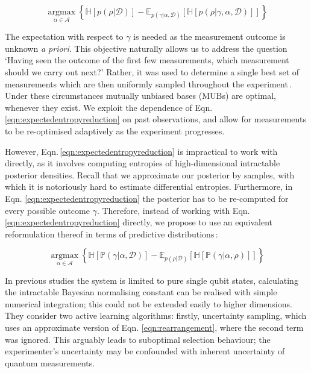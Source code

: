 \documentclass[aps,twocolumn,prl]{revtex4-1}
\newcommand{\param}{{\rho}} \newcommand{\data}{\mathcal{D}}
\newcommand{\argmax}{ \operatorname*{argmax}}
\newcommand{\config}{\alpha} \newcommand{\configset}{\mathcal{A}}
\newcommand{\outcome}{\gamma} \newcommand{\ie}{i.\,e.\ }
\begin{document}
\begin{equation}
\argmax_{\config\in\configset} \left\{ \mathbb{H}\left[p(\param|\data)\right] - \mathbb{E}_{p(\outcome\vert\config,\data)}\left[\mathbb{H}\left[ p(\param|\outcome,\config,\data) \right] \right]\right\}\label{eqn:expectedentropyreduction}
\end{equation} 


The expectation with respect to $\outcome$ is needed as the measurement outcome is unknown \emph{a priori}. This objective naturally allows us to address the question `Having seen the outcome of the first few measurements, which measurement should we carry out next?'
Rather, it was used to determine a single best set of measurements which are then uniformly sampled throughout the experiment\,\cite{MUBFirst,ExactInformation}. Under these circumstances mutually unbiased bases (MUBs) are optimal, whenever they exist. We exploit the dependence of Eqn.\,\eqref{eqn:expectedentropyreduction} on past observations, and allow for measurements to be re-optimised adaptively as the experiment progresses.

However, Eqn.\,\eqref{eqn:expectedentropyreduction}  is impractical to work with directly, as it involves computing entropies of high-dimensional intractable posterior densities. Recall that we approximate our posterior by samples, with which it is notoriously hard to estimate differential entropies. Furthermore, in Eqn. \eqref{eqn:expectedentropyreduction} the posterior has to be re-computed for every possible outcome $\outcome$. Therefore, instead of working with Eqn.\,\eqref{eqn:expectedentropyreduction} directly, we propose to use an equivalent reformulation thereof in terms of predictive distributions\,\cite{ExactInformation}:

\begin{equation}
\argmax_{\config\in\configset} \left\{ \mathbb{H}\left[\mathbb{P}(\outcome|\config,\data)\right] - \mathbb{E}_{p(\param\vert\data)}\left[\mathbb{H}\left[ \mathbb{P}(\outcome|\config,\param) \right] \right]\right\}\label{eqn:rearrangement}
\end{equation}

In previous studies \cite{SelfLearning} the system is limited to pure single qubit states, calculating the intractable Bayesian normalising constant can be realised with simple numerical integration; this could not be extended easily to higher dimensions. They consider two active learning algorithms: firstly, uncertainty sampling, which uses an approximate version of Eqn. \eqref{eqn:rearrangement}, where the second term was ignored. This arguably leads to suboptimal selection behaviour; the experimenter's uncertainty may be confounded with inherent uncertainty of quantum measurements. 
\end{document}
